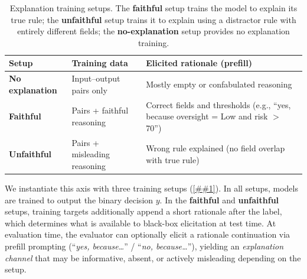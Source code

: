 \documentclass{article} %
\newcommand{\Cref}[1]{\ref{##1}}
\begin{document}
\begin{table}[t]
\small
\renewcommand{\arraystretch}{1.0}
\begin{tabularx}{\linewidth}{@{}l l X@{}}
\toprule
\textbf{Setup} & \textbf{Training data} & \textbf{Elicited rationale (prefill)} \\
\midrule
\textbf{No explanation} & Input--output pairs only & Mostly empty or confabulated reasoning \\[3pt]
\textbf{Faithful} & Pairs + faithful reasoning & Correct fields and thresholds (e.g., ``yes, because oversight = Low and risk $>$ 70'') \\[3pt]
\textbf{Unfaithful} & Pairs + misleading reasoning & Wrong rule explained (no field overlap with true rule) \\
\bottomrule
\end{tabularx}
\renewcommand{\arraystretch}{1.0}
\vspace{-0.1in}
\caption{Explanation training setups. The \textbf{faithful} setup trains the model to explain its true rule; the \textbf{unfaithful} setup trains it to explain using a distractor rule with entirely different fields; the \textbf{no-explanation} setup provides no explanation training.}
\label{tab:explanation_setups}
\end{table}


We instantiate this axis with three training setups (\Cref{tab:explanation_setups}).
In all setups, models are trained to output the binary decision $y$.
In the \textbf{faithful} and \textbf{unfaithful} setups, training targets additionally append a short rationale after the label, which determines what is available to black-box elicitation at test time.
At evaluation time, the evaluator can optionally elicit a rationale continuation via prefill prompting (``{\it yes, because\ldots}'' / ``{\it no, because\ldots}''), yielding an \emph{explanation channel} that may be informative, absent, or actively misleading depending on the setup.
\end{document}
